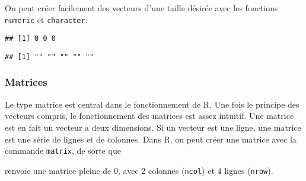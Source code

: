 On peut créer facilement des vecteurs d'une taille désirée avec les fonctions \texttt{numeric} et \texttt{character}:

\begin{knitrout}
\color{fgcolor}\begin{kframe}
\begin{flushleft}
\ttfamily\noindent
{}\hlkeyword{(}\hlkeyword{)}\mbox{}
\normalfont
\end{flushleft}
\begin{verbatim}
## [1] 0 0 0
\end{verbatim}
\begin{flushleft}
\ttfamily\noindent
{}\hlkeyword{(}\hlkeyword{)}\mbox{}
\normalfont
\end{flushleft}
\begin{verbatim}
## [1] "" "" "" "" ""
\end{verbatim}
\end{kframe}
\end{knitrout}


\subsubsection{Matrices}

Le type matrice est central dans le fonctionnement de R.
Une fois le principe des vecteurs compris, le fonctionnement des matrices est assez intuitif.
Une matrice est en fait un vecteur a deux dimensions.
Si un vecteur est une ligne, une matrice est une série de lignes et de colonnes.
Dans R, on peut créer une matrice avec la commande \texttt{matrix}, de sorte que

\begin{knitrout}
\color{fgcolor}\begin{kframe}
\begin{flushleft}
\ttfamily\noindent
{}\hlassignement{\usebox{\hlnormalsizeboxlessthan}-}{\ }\hlkeyword{(}\hlkeyword{,}{\ }\hlargument{=}{\ }\hlkeyword{,}{\ }\hlargument{=}{\ }\hlkeyword{)}\mbox{}
\normalfont
\end{flushleft}
\end{kframe}
\end{knitrout}


\noindent renvoie une matrice pleine de 0, avec 2 colonnes (\texttt{ncol}) et 4 lignes (\texttt{nrow}).

